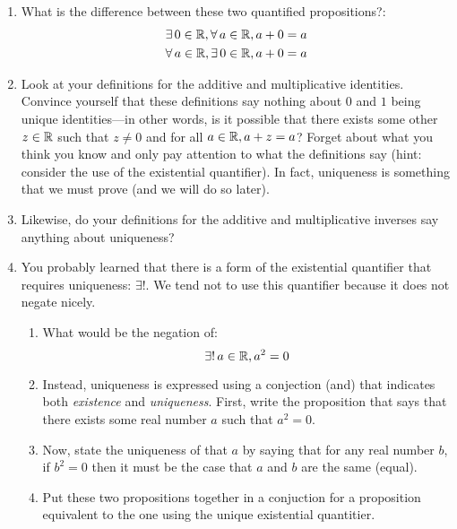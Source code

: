 \documentclass[letterpaper,12pt,fleqn]{article}
\begin{document}
\begin{enumerate}[left=0in,itemsep=0.5in]
\item What is the difference between these two quantified propositions?:
  \begin{gather*}
    \exists\,0\in\mathbb{R},\forall\,a\in\mathbb{R},a+0=a \\
    \forall\,a\in\mathbb{R},\exists\,0\in\mathbb{R},a+0=a
  \end{gather*}

\item Look at your definitions for the additive and multiplicative identities.  Convince yourself that these
  definitions say nothing about \(0\) and \(1\) being unique identities---in other words, is it possible that there
  exists some other \(z\in\mathbb{R}\) such that \(z\ne0\) and for all \(a\in\mathbb{R}, a+z=a\)?  Forget about what you think you
  know and only pay attention to what the definitions say (hint: consider the use of the existential quantifier).
  In fact, uniqueness is something that we must prove (and we will do so later).

\item Likewise, do your definitions for the additive and multiplicative inverses say anything about uniqueness?

\item You probably learned that there is a form of the existential quantifier that requires uniqueness: \(\exists!\).
  We tend not to use this quantifier because it does not negate nicely.
  \begin{enumerate}
  \item What would be the negation of:
    \[\exists!\,a\in\mathbb{R},a^2=0\]
  \item Instead, uniqueness is expressed using a conjection (and) that indicates both \emph{existence} and
    \emph{uniqueness}.  First, write the proposition that says that there exists some real number \(a\) such that
    \(a^2=0\).
  \item Now, state the uniqueness of that \(a\) by saying that for any real number \(b\), if \(b^2=0\) then it
    must be the case that \(a\) and \(b\) are the same (equal).
  \item Put these two propositions together in a conjuction for a proposition equivalent to the one using the
    unique existential quantitier.
  \end{enumerate}


\end{enumerate}
\end{document}

